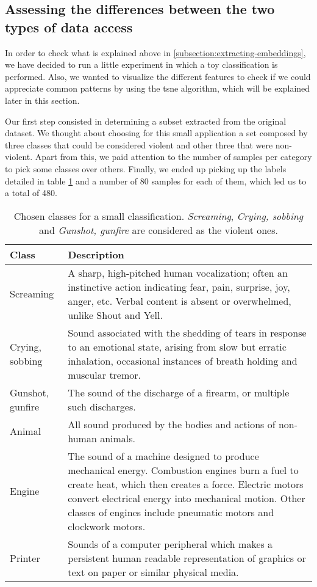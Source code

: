 \subsection{Assessing the differences between the two types of data access}
\label{subsection:exploring-differences-between-two-types-of-data-access}

	In order to check what is explained above in \ref{subsection:extracting-embeddings}, we have decided to run a little experiment in which a toy classification is performed. Also, we wanted to visualize the different features to check if we could appreciate common patterns by using the \acrfull{tsne} algorithm, which will be explained later in this section.

	Our first step consisted in determining a subset extracted from the original dataset. We thought about choosing for this small application a set composed by three classes that could be considered violent and other three that were non-violent. Apart from this, we paid attention to the number of samples per category to pick some classes over others. Finally, we ended up picking up the labels detailed in table \ref{table:4} and a number of 80 samples for each of them, which led us to a total of 480.
	
	\begin{table}[h]
		\begin{center}
			\begin{tabular}{||m{7em} | m{23em} ||}
				\hline
				\textbf{Class} & \textbf{Description} \\
				\hline\hline
				Screaming & A sharp, high-pitched human vocalization; often an instinctive action indicating fear, pain, surprise, joy, anger, etc. Verbal content is absent or overwhelmed, unlike Shout and Yell. \\
				\hline
				Crying, sobbing & Sound associated with the shedding of tears in response to an emotional state, arising from slow but erratic inhalation, occasional instances of breath holding and muscular tremor. \\
				\hline
				Gunshot, gunfire & The sound of the discharge of a firearm, or multiple such discharges. \\
				\hline
				Animal & All sound produced by the bodies and actions of non-human animals. \\
				\hline
				Engine & The sound of a machine designed to produce mechanical energy. Combustion engines burn a fuel to create heat, which then creates a force. Electric motors convert electrical energy into mechanical motion. Other classes of engines include pneumatic motors and clockwork motors. \\
				\hline
				Printer & Sounds of a computer peripheral which makes a persistent human readable representation of graphics or text on paper or similar physical media. \\
				\hline
			\end{tabular}
		\end{center}
		\caption{Chosen classes for a small classification. \textit{Screaming}, \textit{Crying, sobbing} and \textit{Gunshot, gunfire} are considered as the violent ones.}
		\label{table:4}
	\end{table}
	
